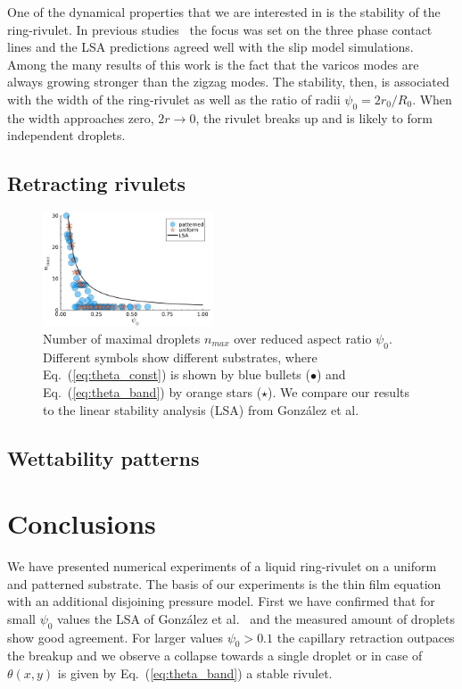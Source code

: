 \documentclass[twoside,twocolumn,9pt]{article}
\begin{document}
One of the dynamical properties that we are interested in is the stability of the ring-rivulet.
In previous studies~\cite{gonzalezStabilityLiquidRing2013} the focus was set on the three phase contact lines and the LSA predictions agreed well with the slip model simulations.
Among the many results of this work is the fact that the varicos modes are always growing stronger than the zigzag modes.
The stability, then, is associated with the width of the ring-rivulet as well as the ratio of radii $\psi_0 = 2r_0/R_0$.
When the width approaches zero, $2r \rightarrow 0$, the rivulet breaks up and is likely to form independent droplets.



\subsection{Retracting rivulets}\label{subsec:retract}
\begin{figure}
    \centering
    \includegraphics[width=0.45\textwidth]{assets/LSA_droplets.pdf}
    \caption{Number of maximal droplets $n_{max}$ over reduced aspect ratio $\psi_0$.
    Different symbols show different substrates, where Eq.~(\ref{eq:theta_const}) is shown by blue bullets (\textcolor{jlblue}{$\bullet$}) and Eq.~(\ref{eq:theta_band}) by orange stars (\textcolor{jlorange}{$\star$}).
    We compare our results to the linear stability analysis (LSA) from Gonz{\'a}lez et al.~\cite{gonzalezStabilityLiquidRing2013}}
    \label{fig:max_drops}
\end{figure}

\subsection{Wettability patterns}\label{subsec:wettability}


\section{Conclusions}\label{sec:conclu}
We have presented numerical experiments of a liquid ring-rivulet on a uniform and patterned substrate. 
The basis of our experiments is the thin film equation with an additional disjoining pressure model.
First we have confirmed that for small $\psi_0$ values the LSA of Gonz{\'a}lez et al.~\cite{gonzalezStabilityLiquidRing2013} and the measured amount of droplets show good agreement.
For larger values $\psi_0 > 0.1$ the capillary retraction outpaces the breakup and we observe a collapse towards a single droplet or in case of $\theta(x,y)$ is given by Eq.~(\ref{eq:theta_band}) a stable rivulet.
\end{document}
